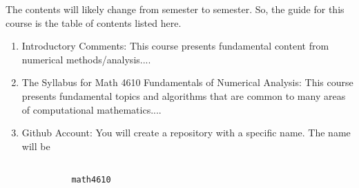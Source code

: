 \documentclass[10pt,fleqn]{article}
\begin{document}
The contents will likely change from semester to semester. So, the guide for
this course is the table of contents listed here.
\noindent
\begin{enumerate}
  \item Introductory Comments: This course presents fundamental content from
        numerical methods/analysis....
  \item The Syllabus for Math 4610 Fundamentals of Numerical Analysis: This
        course presents fundamental topics and algorithms that are common to
        many areas of computational mathematics....
  \item Github Account: You will create a repository with a specific name. The
        name will be 
        \begin{verbatim}
 
          math4610


\end{verbatim}
\end{enumerate}
\end{document}

